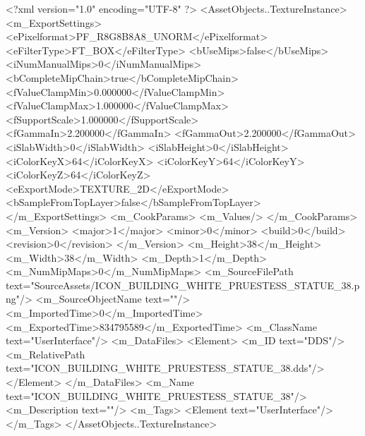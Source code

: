 <?xml version="1.0" encoding="UTF-8" ?>
<AssetObjects..TextureInstance>
	<m_ExportSettings>
		<ePixelformat>PF_R8G8B8A8_UNORM</ePixelformat>
		<eFilterType>FT_BOX</eFilterType>
		<bUseMips>false</bUseMips>
		<iNumManualMips>0</iNumManualMips>
		<bCompleteMipChain>true</bCompleteMipChain>
		<fValueClampMin>0.000000</fValueClampMin>
		<fValueClampMax>1.000000</fValueClampMax>
		<fSupportScale>1.000000</fSupportScale>
		<fGammaIn>2.200000</fGammaIn>
		<fGammaOut>2.200000</fGammaOut>
		<iSlabWidth>0</iSlabWidth>
		<iSlabHeight>0</iSlabHeight>
		<iColorKeyX>64</iColorKeyX>
		<iColorKeyY>64</iColorKeyY>
		<iColorKeyZ>64</iColorKeyZ>
		<eExportMode>TEXTURE_2D</eExportMode>
		<bSampleFromTopLayer>false</bSampleFromTopLayer>
	</m_ExportSettings>
	<m_CookParams>
		<m_Values/>
	</m_CookParams>
	<m_Version>
		<major>1</major>
		<minor>0</minor>
		<build>0</build>
		<revision>0</revision>
	</m_Version>
	<m_Height>38</m_Height>
	<m_Width>38</m_Width>
	<m_Depth>1</m_Depth>
	<m_NumMipMaps>0</m_NumMipMaps>
	<m_SourceFilePath text="SourceAssets/ICON_BUILDING_WHITE_PRUESTESS_STATUE_38.png"/>
	<m_SourceObjectName text=""/>
	<m_ImportedTime>0</m_ImportedTime>
	<m_ExportedTime>834795589</m_ExportedTime>
	<m_ClassName text="UserInterface"/>
	<m_DataFiles>
		<Element>
			<m_ID text="DDS"/>
			<m_RelativePath text="ICON_BUILDING_WHITE_PRUESTESS_STATUE_38.dds"/>
		</Element>
	</m_DataFiles>
	<m_Name text="ICON_BUILDING_WHITE_PRUESTESS_STATUE_38"/>
	<m_Description text=""/>
	<m_Tags>
		<Element text="UserInterface"/>
	</m_Tags>
</AssetObjects..TextureInstance>

